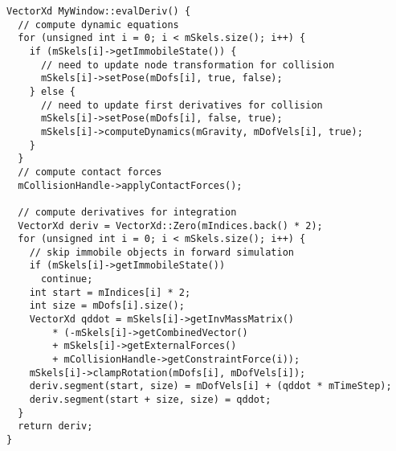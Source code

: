 \ttfamily
\begin{lstlisting}[label=evalDeriv,caption=evalDeriv]
VectorXd MyWindow::evalDeriv() {
  // compute dynamic equations
  for (unsigned int i = 0; i < mSkels.size(); i++) {
    if (mSkels[i]->getImmobileState()) {
      // need to update node transformation for collision
      mSkels[i]->setPose(mDofs[i], true, false);
    } else {
      // need to update first derivatives for collision
      mSkels[i]->setPose(mDofs[i], false, true);
      mSkels[i]->computeDynamics(mGravity, mDofVels[i], true);
    }
  }
  // compute contact forces
  mCollisionHandle->applyContactForces();

  // compute derivatives for integration
  VectorXd deriv = VectorXd::Zero(mIndices.back() * 2);    
  for (unsigned int i = 0; i < mSkels.size(); i++) {
    // skip immobile objects in forward simulation
    if (mSkels[i]->getImmobileState())
      continue;
    int start = mIndices[i] * 2;
    int size = mDofs[i].size();
    VectorXd qddot = mSkels[i]->getInvMassMatrix() 
        * (-mSkels[i]->getCombinedVector() 
        + mSkels[i]->getExternalForces() 
        + mCollisionHandle->getConstraintForce(i));
    mSkels[i]->clampRotation(mDofs[i], mDofVels[i]);
    deriv.segment(start, size) = mDofVels[i] + (qddot * mTimeStep);
    deriv.segment(start + size, size) = qddot;
  }
  return deriv;
}
\end{lstlisting}
\rmfamily



